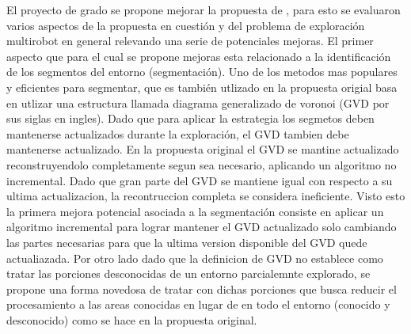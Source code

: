 El proyecto de grado se propone mejorar la propuesta de
\cite{wurm2008coordinated}, para esto se evaluaron varios aspectos de la
propuesta en cuestión y del problema de exploración multirobot en general
relevando una serie de potenciales mejoras. El primer aspecto que para el cual se propone mejoras esta relacionado a la
identificación de los segmentos del entorno (segmentación). Uno de los metodos
mas populares y eficientes para segmentar, que es también utlizado en la
propuesta origial basa en utlizar una estructura llamada diagrama generalizado
de voronoi (GVD por sus siglas en ingles). Dado que para aplicar la estrategia
los segmetos deben mantenerse actualizados durante la exploración, el GVD
tambien debe mantenerse actualizado. En la propuesta original el GVD se mantine
actualizado reconstruyendolo completamente segun sea necesario, aplicando un
algoritmo no incremental. Dado que gran parte del GVD se mantiene igual con
respecto a su ultima actualizacion, la recontruccion completa se considera
ineficiente. Visto esto la primera mejora potencial asociada a la segmentación
consiste en aplicar un algoritmo incremental para lograr mantener el GVD
actualizado solo cambiando las partes necesarias para que la ultima version
disponible del GVD quede actualiazada. Por otro lado dado que la definicion de
GVD no establece como tratar las porciones desconocidas de un entorno
parcialemnte explorado, se propone una forma novedosa de tratar con dichas
porciones que busca reducir el procesamiento a las areas conocidas en lugar de
en todo el entorno (conocido y desconocido) como se hace en la propuesta
original.







